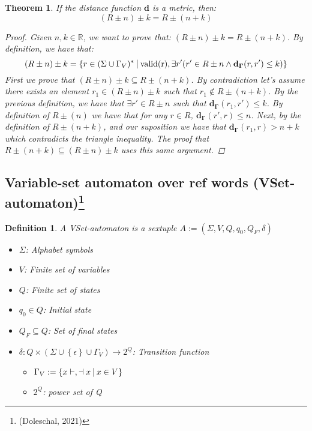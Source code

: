\documentclass{article}
\newcommand{\set}[1]{\left\{#1\right\}}
\newcommand{\st}{\ \vline \ }
\newcommand{\ra}{\rightarrow}
\newtheorem{theorem}{Theorem}
\newtheorem{definition}{Definition}
\begin{document}
\newpage
\begin{theorem}\label{TheoremMetric}
    If the distance function $\mathbf{d}$ is a metric, then:
    \begin{equation}
        (R\pm n) \pm k = R\pm(n + k)
    \end{equation}
    \begin{proof}
	Given $n, k \in \mathbb{R}$, we want to prove that: $(R\pm
	n )\pm k = R \pm (n + k)$.
    By definition, we have that:
    \begin{equation*}
        (R \pm n) \pm k = \set{r \in (\Sigma \cup \Gamma_V)^* \st  \mathrm{valid(r)}, \exists r' (r'\in R \pm n \land \mathbf{d_\Gamma}(r, r') \leq k)}
    \end{equation*}
    First we prove that $(R \pm n) \pm k \subseteq R \pm (n + k)$.
    By contradiction let's assume there exists an element $r_1 \in
    (R \pm n) \pm k$ such that $r_1 \notin R\pm (n + k)$. By the
    previous definition, we have that $\exists r' \in R\pm n$ such
    that $\mathbf{d_\Gamma}(r_1, r') \leq k$. By definition of $R
    \pm (n)$ we have that for any $r \in R$, $\mathbf{d_\Gamma}(r',
    r) \leq n$. Next, by the definition of $R \pm (n + k)$, and our
    suposition we have that $\mathbf{d_\Gamma}(r_1, r) > n + k$
    which contradicts the triangle inequality. The proof that $R
    \pm (n + k) \subseteq (R \pm n) \pm k$ uses this same argument.

    \end{proof}
\end{theorem}

\subsection*{Variable-set automaton over ref words (VSet-automaton)\footnote{(Doleschal, 2021)}}

\begin{definition}
A VSet-automaton is a sextuple $A:=(\Sigma, V, Q, q_0, Q_F,\delta)$
\begin{itemize}
    \item $\Sigma$: Alphabet symbols
    \item $V$: Finite set of variables
    \item $Q$: Finite set of states
    \item $q_0\in Q$: Initial state
    \item $Q_F\subseteq Q$: Set of final states
    \item $\delta: Q \times (\Sigma\cup\set{\epsilon}\cup\Gamma_V)\ra
          2^Q$: Transition function
        \begin{itemize}
            \item $\Gamma_V:=\set{x\vdash, \dashv x \st x \in V}$
            \item $2^Q$: power set of Q
        \end{itemize}
\end{itemize}
\end{definition}
\end{document}
